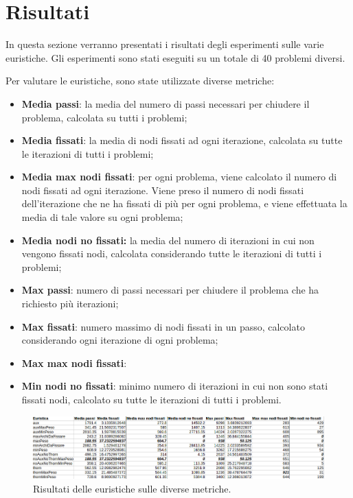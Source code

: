 \section{Risultati}
\label{sec:risultati}

In questa sezione verranno presentati i risultati degli esperimenti sulle varie euristiche. Gli esperimenti sono stati eseguiti su un totale di 40 problemi diversi. 

Per valutare le euristiche, sono state utilizzate diverse metriche:

\begin{itemize}
\item \textbf{Media passi}: la media del numero di passi necessari per chiudere il problema, calcolata su tutti i problemi;
\item \textbf{Media fissati}: la media di nodi fissati ad ogni iterazione, calcolata su tutte le iterazioni di tutti i problemi;
\item \textbf{Media max nodi fissati}: per ogni problema, viene calcolato il numero di nodi fissati ad ogni iterazione. Viene preso il numero di nodi fissati dell'iterazione che ne ha fissati di più per ogni problema, e viene effettuata la media di tale valore su ogni problema;
\item \textbf{Media nodi no fissati:} la media del numero di iterazioni in cui non vengono fissati nodi, calcolata considerando tutte le iterazioni di tutti i problemi;
\item \textbf{Max passi}: numero di passi necessari per chiudere il problema che ha richiesto più iterazioni;
\item \textbf{Max fissati}: numero massimo di nodi fissati in un passo, calcolato considerando ogni iterazione di ogni problema;
\item \textbf{Max max nodi fissati}:
\item \textbf{Min nodi no fissati}: minimo numero di iterazioni in cui non sono stati fissati nodi, calcolato su tutte le iterazioni di tutti i problemi.
\end{itemize}

\begin{figure}[H]
\includegraphics[width=\textwidth]{res/img/results.png}
\caption{Risultati delle euristiche sulle diverse metriche.}
\label{fig:results}
\end{figure}

